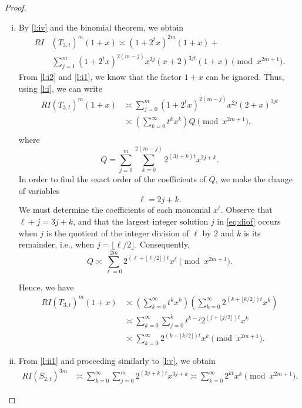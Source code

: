 \documentclass[10pt,a4paper]{amsart}
\newcommand{\floor}[1]{\lfloor #1\rfloor}
\begin{document}
\begin{proof}
\begin{enumerate}[(i)]
\item By \eqref{l:iv} and  the binomial theorem,  we obtain
\begin{align*}
RI&(T_{3,t})^m (1+x)\asymp (1+2^tx)^{2m}(1+x)+\\
&\,\sum_{j=1}^m(1+2^tx)^{2(m-j)} x^{2j}(x+2)^{3jt}(1+x) \pmod{x^{2m+1}}.
\end{align*}
From \eqref{l:i2} and \eqref{l:i1}, we know that the factor $1+x$ can be ignored. Thus, using  \eqref{l:i}, we can write
\begin{align*}
RI(T_{3,t})^m (1+x)&\asymp \sum_{j=0}^m(1+2^tx)^{2(m-j)} x^{2j}(2+x)^{3jt}\\&
\asymp \left(\sum_{k=0}^\infty t^{k} x^k\right)Q \pmod{x^{2m+1}},\\
\end{align*}
where
\[
Q=\sum_{j=0}^m \sum_{k=0}^{2(m-j)}2^{(3j+k)t}x^{2j+k}.
\] In order to find the exact order of the coefficients of $Q$, we make the change of variables
\begin{equation}
  \label{eq:diof}
\ell=2j+k.  
\end{equation} 
We must determine the coefficients of each monomial $x^\ell$. Observe that $\ell + j = 3j + k$, and that the largest integer solution $j$ in \eqref{eq:diof} occurs when $j$ is the quotient of the integer division of $\ell$ by $2$ and $k$ is its remainder, i.e., when $j = \lfloor \ell/2 \rfloor$. Consequently,
\[
Q\asymp\sum_{\ell=0}^{2m}2^{(\ell+\floor{\ell/2})t}x^\ell\pmod{x^{2m+1}}.
\]



Hence, we have
\begin{align*}
RI(T_{3,t})^m (1+x)&\asymp \left(\sum_{k=0}^\infty t^k x^k\right)\left( \sum_{k=0}^\infty 2^{(k+\floor{k/2})t}x^k\right) \\
&\asymp \sum_{k=0}^\infty \sum_{j=0}^k t^{k-j}2^{(j+\floor{{j}/{2}})t}x^k\\
&\asymp \sum_{k=0}^{\infty} 2^{(k+\floor{k/2})t}x^k \pmod{x^{2m+1}}.
\end{align*}


\item From \eqref{l:ii1} and proceeding similarly to \eqref{l:v}, we obtain
\begin{align*}
RI(S_{2,t})^{3m}&\asymp \sum_{k=0}^{\infty}\sum_{j=0}^m 2^{(3j+k)t}x^{3j+k}\asymp\sum_{k=0}^\infty 2^{kt}x^k\pmod{x^{2m+1}}.
\end{align*}\end{enumerate}	
\end{proof}
\end{document}
